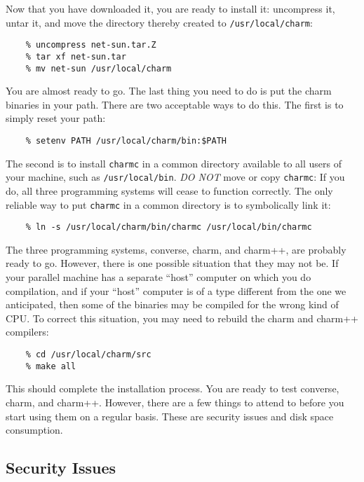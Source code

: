 Now that you have downloaded it, you are ready to install it: uncompress it,
untar it, and move the directory thereby created to {\tt /usr/local/charm}:

\begin{verbatim}
    % uncompress net-sun.tar.Z
    % tar xf net-sun.tar
    % mv net-sun /usr/local/charm
\end{verbatim}

You are almost ready to go.  The last thing you need to do is put the
charm binaries in your path.  There are two acceptable ways to do
this.  The first is to simply reset your path:

\begin{verbatim}
    % setenv PATH /usr/local/charm/bin:$PATH
\end{verbatim}

The second is to install {\tt charmc} in a common directory available
to all users of your machine, such as {\tt /usr/local/bin}.  {\em DO
NOT} move or copy {\tt charmc}: If you do, all three programming
systems will cease to function correctly.  The only reliable way to
put {\tt charmc} in a common directory is to symbolically link it:

\begin{verbatim}
    % ln -s /usr/local/charm/bin/charmc /usr/local/bin/charmc
\end{verbatim}

The three programming systems, converse, charm, and charm++, are
probably ready to go.  However, there is one possible situation that
they may not be.  If your parallel machine has a separate ``host''
computer on which you do compilation, and if your ``host'' computer is
of a type different from the one we anticipated, then some of the
binaries may be compiled for the wrong kind of CPU.  To correct this
situation, you may need to rebuild the charm and charm++ compilers:

\begin{verbatim}
    % cd /usr/local/charm/src
    % make all
\end{verbatim}

This should complete the installation process.  You are ready to test
converse, charm, and charm++.  However, there are a few things to
attend to before you start using them on a regular basis.  These are
security issues and disk space consumption.

\subsection{Security Issues}

